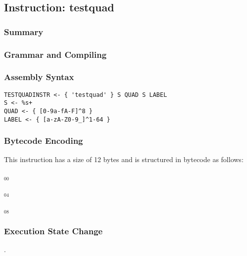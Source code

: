 \subsection{Instruction: testquad}

\subsubsection{Summary}


\subsubsection{Grammar and Compiling}


\subsubsection{Assembly Syntax}

\begin{myquote}
\begin{verbatim}
TESTQUADINSTR <- { 'testquad' } S QUAD S LABEL
S <- %s+
QUAD <- { [0-9a-fA-F]^8 }
LABEL <- { [a-zA-Z0-9_]^1-64 }
\end{verbatim}
\end{myquote}


\subsubsection{Bytecode Encoding}

This instruction has a size of 12 bytes and is structured in bytecode as follows:

$_{00}$\ 



$_{04}$\ 



$_{08}$\ 
\fbox{%
  \parbox{20pt}{%
00
  }%
}


\subsubsection{Execution State Change}

.


